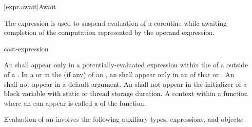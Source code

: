 [expr.await]{Await}
%
%

\pnum
The  expression is used to suspend evaluation of a
coroutine while awaiting completion of
the computation represented by the operand expression.

\begin{bnf}
\br
     cast-expression
\end{bnf}

\pnum
An  shall appear only in a potentially-evaluated
expression within the  of a
 outside of a .
In a  or in the
 (if any)
of an , an 
shall appear only in an  of that
 or .
An  shall not appear in a
default argument.
An  shall not appear in the initializer of
a block variable with static or thread storage duration.
A context within a function where an  can appear
is called a  of the function.

\pnum
Evaluation of an  involves the following
auxiliary types, expressions, and objects:

